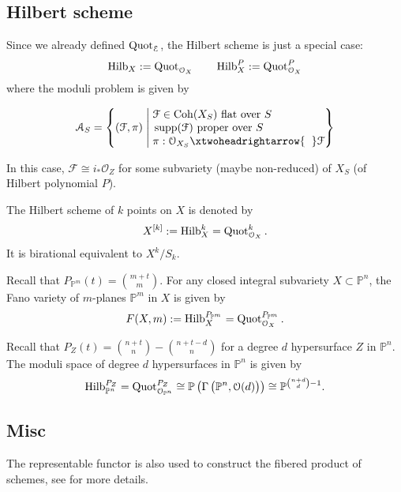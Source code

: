 \subsection{Hilbert scheme}
Since we already defined $\operatorname{Quot}_{\mathcal{E}}$, the Hilbert scheme is just a special case:
$$\operatorname{Hilb}_X:= \operatorname{Quot}_{\mathcal{O}_X} \qquad \operatorname{Hilb}_X^P:= \operatorname{Quot}_{\mathcal{O}_X}^P$$
where the moduli problem is given by

$$\mathcal{A}_S=\left\{(\mathcal{F},\pi)  \;\middle|\; \begin{aligned}
&\\[-5mm]
&\mathcal{F} \in \Coh(X_S) \text{ flat over $S$ }\\[-1mm]
&\supp(\mathcal{F})  \text{ proper over $S$ }\\[-1mm]
& \pi:\mathcal{O}_{X_S} \xtwoheadrightarrow{\hspace{2mm}}  \mathcal{F}
\end{aligned}
 \right\}$$
 
 In this case, $\mathcal{F} \cong i_* \mathcal{O}_Z$ for some subvariety (maybe non-reduced) of $X_S$ (of Hilbert polynomial $P$).
 
\begin{eg}
The Hilbert scheme of $k$ points on $X$ is denoted by $$X^{[k]}:= \operatorname{Hilb}_X^k= \operatorname{Quot}_{\mathcal{O}_X}^k.$$
It is birational equivalent to $X^k/S_k$.
\end{eg} 

\begin{eg}
Recall that $P_{\mathbb{P}^m}(t) = \binom{m+t}{m}$. For any closed integral subvariety $X \subset \mathbb{P}^n$, the Fano variety of $m$-planes $\mathbb{P}^m$ in $X$ is given by
$$F(X,m):= \operatorname{Hilb}_X^{P_{\mathbb{P}^m}}= \operatorname{Quot}_{\mathcal{O}_X}^{P_{\mathbb{P}^m}}.$$
\end{eg} 
\begin{eg}
Recall that $P_{Z}(t) = \binom{n+t}{n}- \binom{n+t-d}{n}$ for a degree $d$ hypersurface $Z$ in $\mathbb{P}^n$.
The moduli space of degree $d$ hypersurfaces in $\mathbb{P}^n$ is given by
$$\Hilb_{\mathbb{P}^n}^{P_{Z}}= \Quot_{\mathcal{O}_{\mathbb{P}^n}}^{P_{Z}} \cong \mathbb{P}\left(\rule{0mm}{3.2mm} \Gamma \left(\rule{0mm}{3mm} \mathbb{P}^n, \mathcal{O}(d) \right) \right) \cong \mathbb{P}^{\binom{n+d}{d}-1}.$$
\end{eg} 




\subsection{Misc}The representable functor is also used to construct the fibered product of schemes, see \cite[9.1.6-7]{FOAG} for more details.

